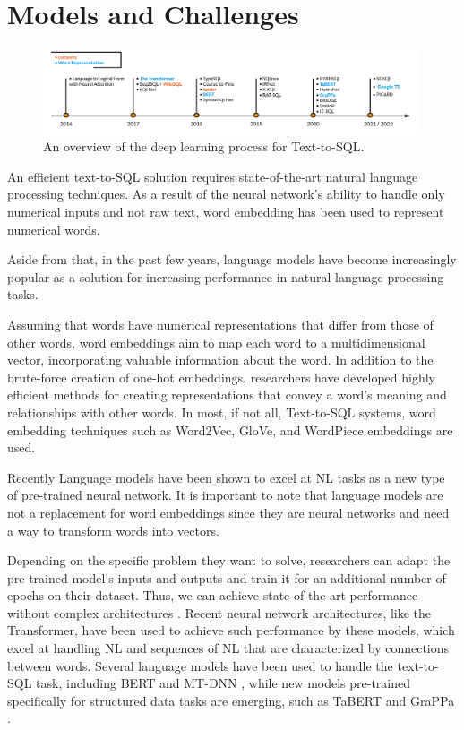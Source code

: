 \section{Models and Challenges}

\begin{figure}[htb]
    \centering
    \includegraphics[width=0.99\textwidth]{pics/Timeline.png}
    \caption{An overview of the deep learning process for Text-to-SQL.}
    \label{fig:timeline}
\end{figure}

An efficient text-to-SQL solution requires state-of-the-art natural language processing techniques.
As a result of the neural network's ability to handle only numerical inputs and not raw text, word embedding has been used to represent numerical words.

Aside from that, in the past few years, language models have become increasingly popular as a solution for increasing performance in natural language processing tasks.

Assuming that words have numerical representations that differ from those of other words, word embeddings aim to map each word to a multidimensional vector, incorporating valuable information about the word. In addition to the brute-force creation of one-hot embeddings, researchers have developed highly efficient methods for creating representations that convey a word's meaning and relationships with other words. In most, if not all, Text-to-SQL systems, word embedding techniques such as Word2Vec\cite{DBLP:journals/corr/Rong14}, GloVe, and WordPiece embeddings\cite{DBLP:journals/corr/WuSCLNMKCGMKSJL16} are used.

Recently Language models have been shown to excel at NL tasks as a new type of pre-trained neural network. It is important to note that language models are not a replacement for word embeddings since they are neural networks and need a way to transform words into vectors.

Depending on the specific problem they want to solve, researchers can adapt the pre-trained model's inputs and outputs and train it for an additional number of epochs on their dataset. Thus, we can achieve state-of-the-art performance without complex architectures \cite{DBLP:journals/corr/abs-1810-04805}. Recent neural network architectures, like the Transformer\cite{DBLP:journals/corr/VaswaniSPUJGKP17}, have been used to achieve such performance by these models, which excel at handling NL and sequences of NL that are characterized by connections between words. Several language models have been used to handle the text-to-SQL task, including BERT \cite{DBLP:journals/corr/abs-1810-04805} and MT-DNN \cite{DBLP:journals/corr/abs-1901-11504}, while new models pre-trained specifically for structured data tasks are emerging, such as TaBERT\cite{DBLP:journals/corr/abs-2005-08314} and GraPPa \cite{DBLP:journals/corr/abs-2009-13845}.

